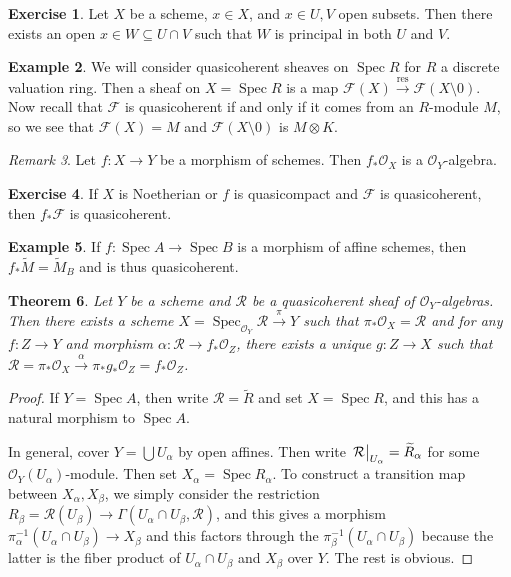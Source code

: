 \documentclass[leqno, openany]{memoir}
\newtheorem{thm}{Theorem}[section]
\theoremstyle{definition}
\newtheorem{exm}[thm]{Example}
\newtheorem{exer}[thm]{Exercise}
\theoremstyle{remark}
\newtheorem{rmk}[thm]{Remark}
\theoremstyle{plain}
\theoremstyle{definition}
\theoremstyle{remark}
\newcommand{\mc}[1]{\mathcal{#1}}
\newcommand{\mr}[1]{\mathrm{#1}}
\newcommand{\wt}[1]{\widetilde{#1}}
\DeclareMathOperator{\Spec}{Spec}
\begin{document}
\begin{exer}
    Let $X$ be a scheme, $x \in X$, and $x \in U,V$ open subsets. Then there exists an open $x \in W \subseteq U \cap V$ such that $W$ is principal in both $U$ and $V$.
\end{exer}

\begin{exm}
    We will consider quasicoherent sheaves on $\Spec R$ for $R$ a discrete valuation ring. Then a sheaf on $X = \Spec R$ is a map $\mc{F}(X) \xrightarrow{\mr{res}} \mc{F}(X \setminus \qty{0})$. Now recall that $\mc{F}$ is quasicoherent if and only if it comes from an $R$-module $M$, so we see that $\mc{F}(X) = M$ and $\mc{F}(X \setminus \qty{0})$ is $M \otimes K$.
\end{exm}

\begin{rmk}
    Let $f \colon X \to Y$ be a morphism of schemes. Then $f_* \mc{O}_X$ is a $\mc{O}_Y$-algebra.
\end{rmk}

\begin{exer}
    If $X$ is Noetherian or $f$ is quasicompact and $\mc{F}$ is quasicoherent, then $f_* \mc{F}$ is quasicoherent.
\end{exer}

\begin{exm}
    If $f \colon \Spec A \to \Spec B$ is a morphism of affine schemes, then $f_* \wt{M} = \wt{M}_B$ and is thus quasicoherent.
\end{exm}

\begin{thm}
    Let $Y$ be a scheme and $\mc{R}$ be a quasicoherent sheaf of $\mc{O}_Y$-algebras. Then there exists a scheme $X = \Spec_{\mc{O}_Y} \mc{R} \xrightarrow{\pi} Y$ such that $\pi_* \mc{O}_X = \mc{R}$ and for any $f \colon Z \to Y$ and morphism $\alpha \colon \mc{R} \to f_* \mc{O}_Z$, there exists a unique $g \colon Z \to X$ such that $\mc{R} = \pi_* \mc{O}_X \xrightarrow{\alpha} \pi_* g_* \mc{O}_Z = f_* \mc{O}_Z$.
\end{thm}

\begin{proof}
    If $Y = \Spec A$, then write $\mc{R} = \wt{R}$ and set $X = \Spec R$, and this has a natural morphism to $\Spec A$.

    In general, cover $Y = \bigcup U_{\alpha}$ by open affines. Then write $\eval{\mc{R}}_{U_{\alpha}} = \wt{R}_{\alpha}$ for some $\mc{O}_Y(U_{\alpha})$-module. Then set $X_{\alpha} = \Spec R_{\alpha}$. To construct a transition map between $X_{\alpha}, X_{\beta}$, we simply consider the restriction $R_{\beta} = \mc{R}(U_{\beta}) \to \Gamma(U_{\alpha} \cap U_{\beta}, \mc{R})$, and this gives a morphism $\pi_{\alpha}^{-1}(U_{\alpha} \cap U_{\beta}) \to X_{\beta}$ and this factors through the $\pi_{\beta}^{-1}(U_{\alpha} \cap U_{\beta})$ because the latter is the fiber product of $U_{\alpha} \cap U_{\beta}$ and $X_{\beta}$ over $Y$. The rest is obvious.
\end{proof}
\end{document}
